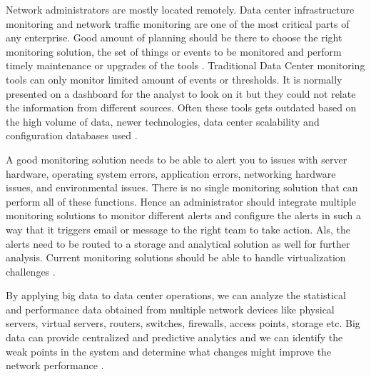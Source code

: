 \documentclass[sigconf]{acmart}
\begin{document}
Network administrators are mostly located remotely. Data center infrastructure monitoring and network traffic monitoring are one of the most critical parts of any enterprise. Good amount of planning should be there to choose the right monitoring solution, the set of things or events to be monitored and perform timely maintenance or upgrades of the tools \cite{how-to-monitor-and-manage-your-data-center-network}. Traditional Data Center monitoring tools can only monitor limited amount of events or thresholds. It is normally presented on a dashboard for the analyst to look on it but they could not relate the information from different sources. Often these tools gets outdated based on the high volume of data, newer technologies, data center scalability and configuration databases used \cite{how-analytics-can-help-your-customers-improve-data-center-operations}. 

A good monitoring solution needs to be able to alert you to issues with server hardware, operating system errors, application errors, networking hardware issues, and environmental issues. There is no single monitoring solution that can perform all of these functions. Hence an administrator should integrate multiple monitoring solutions to monitor different alerts and configure the alerts in such a way that it triggers email or message to the right team to take action. Als, the alerts need to be routed to a storage and analytical solution as well for further analysis. Current monitoring solutions should be able to handle virtualization challenges \cite{how-to-monitor-and-manage-your-data-center-network}. 

By applying big data to data center operations, we can analyze the statistical and performance data obtained from multiple network devices like physical servers, virtual servers, routers, switches, firewalls, access points, storage etc. Big data can provide centralized and predictive analytics and we can identify the weak points in the system and determine what changes might improve the network performance \cite{key-benefits-of-managing-data-center-operations-with-analytics}.
\end{document}
